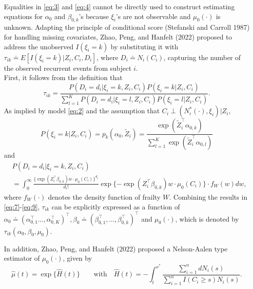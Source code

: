 Equalities in \eqref{eq:3} and \eqref{eq:4} cannot be directly used to construct
estimating equations for \(\alpha_0\) and \(\beta_{0,k}\)'s because
\(\xi _{i}\)'s are not observable and \(\mu_0(\cdot)\) is unknown. Adapting the principle of
conditional score (Stefanski and Carroll 1987) for handling missing covariates, Zhao, Peng, and Hanfelt (2022) proposed to address the unobserved \(I(\xi _i = k )\) by substituting it with \(\tau _{ik} \doteq E[I(\xi _i = k) | Z_i, C_i, D_i]\), where \(D_i \doteq N_i(C_i)\), capturing the number of the observed recurrent events from subject \(i\).\\
First, it follows from the definition that
\begin{equation}
\label{eq:7}
\tau _{ik} = \frac{P(D_{i} = d_{i} | \xi _{i} = k, Z _{i}, C_{i}) P(\xi _{i} = k | Z_{i}, C_{i})}{\sum _{l = 1} ^{K} P(D_{i} = d_{i} | \xi _{i} = l, Z _{i}, C_{i}) P(\xi _{i} = l | Z_{i}, C_{i})}. 
\end{equation}
As implied by model \eqref{eq:2} and the assumption that
\(C_i \perp (N^{*} _i (\cdot) , \xi _i ) | Z_i\),
\begin{equation}
\label{eq:8}
P(\xi _i = k | Z_i, C_i) = p_k (\alpha _0, \tilde{Z} _i) = \frac{\exp(\tilde{Z} _{i} ^{\top} \alpha _{0,k})}{\sum _{l = 1} ^{K} \exp(\tilde{Z} _{i} ^{\top} \alpha _{0,l})} 
\end{equation}
and
\begin{align} 
\label{eq:9}
&P ( D _{i} = d_{i} | \xi _{i} = k , Z _{i}, C _{i})\\\nonumber
&= \int _{0} ^{\infty} \frac{ \{\exp(Z_{i} ^{\top} \beta _{0,k}) w \cdot \mu_{0}(C _{i}) \} ^{d_{i}} }{d_{i} !} \exp \{ - \exp(Z_{i} ^{\top} \beta _{0,k}) w \cdot \mu _{0} (C _{i}) \} \cdot f _{W} (w) dw,   
\end{align}
where \(f_W (\cdot)\) denotes the density function of frailty \(W\).
Combining the results in \eqref{eq:7}-\eqref{eq:9}, \(\tau_{ik}\) can be explicitly expressed as a function of \(\alpha_0\doteq (\alpha_{0,1}^\top\ldots, \alpha_{0, K}^\top)^\top, \beta_0\doteq (\beta_{0,1}^\top,\ldots, \beta_{0,k}^\top)^\top\) and \(\mu_0(\cdot)\), which is denoted by \(\tau_{ik}(\alpha_0, \beta_0, \mu_0)\).

In addition, Zhao, Peng, and Hanfelt (2022) proposed a
Nelson-Aalen type estimator of \(\mu_0(\cdot)\), given by
\begin{equation} 
\label{eq:10}
\hat{\mu}(t) = \exp \{  \hat{H}(t) \} \qquad \text{with} \quad \hat{H}(t) = - \int _{t} ^{\nu ^{*}} \frac{\sum _{i = 1} ^{n} d N_i(s)}{\sum _{i = 1} ^{n} I(C_i \ge s) N_i (s)}.  
\end{equation}

